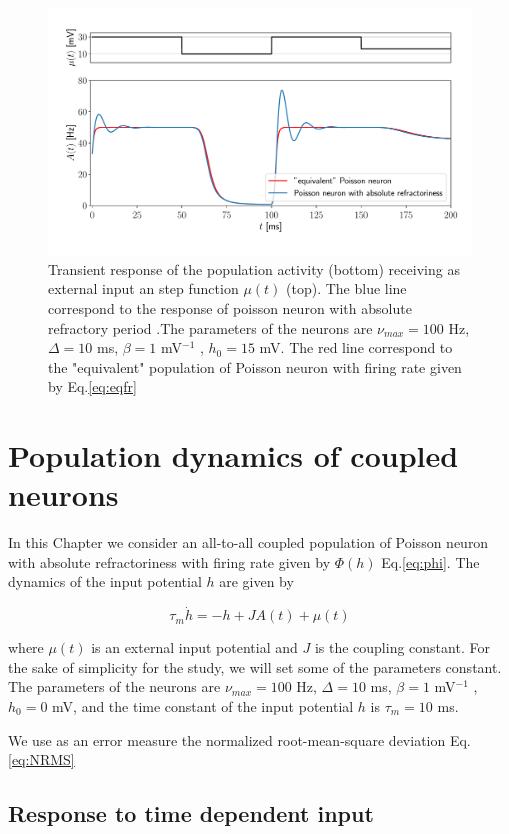 \documentclass[12pt,twoside]{report}
\begin{document}
\begin{figure}[h!]
	\centering
	\includegraphics[width=0.7\linewidth]{refractory_rep.pdf}
	\caption{Transient response of the population activity (bottom) receiving as external input an step function $\mu(t)$ (top). The blue line correspond to the response of poisson neuron with absolute refractory period .The parameters of the neurons are $\nu_{max}=100$ Hz, $\Delta=10$ ms, $\beta=1$ mV$^{-1}$ , $h_0=15$ mV. The red line correspond to the "equivalent" population of Poisson neuron with firing rate given by Eq.\eqref{eq:eqfr}
	}
	\label{fig:refractory_rep}
\end{figure}



\chapter{Population dynamics of coupled neurons}
\label{chap:coupled}

In this Chapter we consider an all-to-all coupled population of Poisson neuron with absolute refractoriness with firing rate given by $\Phi(h)$ Eq.\eqref{eq:phi}. The dynamics of the input potential $h$ are given by

\begin{equation}
\label{eq:h2}
\tau_m\dot{h}=-h+JA(t)+\mu(t)
\end{equation}

where $\mu(t)$ is an external input potential and $J$ is the coupling constant. For the sake of simplicity for the study, we will set some of the parameters constant. The parameters of the neurons are $\nu_{max}=100$ Hz, $\Delta=10$ ms, $\beta=1$ mV$^{-1}$ , $h_0=0$ mV, and the time constant of the input potential $h$ is $\tau_m=10$ ms.


We use as an error measure the normalized root-mean-square deviation Eq.\eqref{eq:NRMS}

\section{Response to time dependent input}
\end{document}
